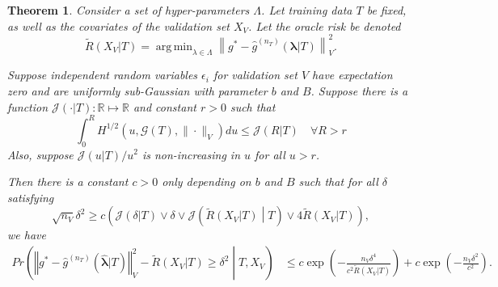 \documentclass[10pt]{book}
\newtheorem{theorem}{Theorem}
\theoremstyle{definition}
\DeclareMathOperator*{\argmin}{arg\,min}
\begin{document}
\begin{theorem}
	\label{thrm:train_val_complicated}
	Consider a set of hyper-parameters $\Lambda$.
	Let training data $T$ be fixed, as well as the covariates of the validation set $X_V$.
	Let the oracle risk be denoted
	\begin{equation}
	\tilde{R}(X_V|T) = \argmin_{\lambda \in \Lambda} \left \| g^*-\hat{g}^{(n_T)}( \boldsymbol{\lambda} | T) \right \|_{V}^{2}.
	\label{eq:tilde_lambda_def}
	\end{equation}
	
	Suppose independent random variables $\epsilon_i$ for validation set $V$ have expectation zero and are uniformly sub-Gaussian with parameter $b$ and $B$.
	Suppose there is a function $\mathcal{J} (\cdot | T):\mathbb{R}\mapsto\mathbb{R}$ and constant $r > 0$ such that
	\begin{equation}
	\label{eq:dudley_bound}
	\int_{0}^{R}H^{1/2}(u,\mathcal{G}(T),\|\cdot\|_{V})du\le \mathcal{J} (R| T) \quad \forall R>r
	\end{equation}
	Also, suppose $\mathcal{J} \left(u | T \right)/u^{2}$ is non-increasing in $u$ for all $u > r$.

	Then there is a constant $c>0$ only depending on $b$ and $B$ such that for all $\delta$ satisfying
	\begin{equation}
	\label{eq:train_val_delta_condn}
	\sqrt{n_V}\delta^{2}
	\ge
	c \left ( 
	\mathcal{J}(\delta| T)
	\vee 
	\delta
	\vee
	\mathcal{J} \left (\tilde{R}(X_V|T)\middle | T
	\right ) 
	\vee
	4 \tilde{R}(X_V|T) \right ),
	\end{equation}
	we have
	\begin{align}
		Pr\left(
		\left\Vert g^* - \hat{g}^{(n_T)}( \hat{\boldsymbol{\lambda}} | T) \right\Vert _{V}^2 -
		\tilde{R}(X_V|T)
		\ge\delta^2
		\middle | 
		T, X_V
		\right )
		&\le c\exp\left(-\frac{n_{V}\delta^{4}}{
			c^{2}
			\tilde{R}(X_V|T)
		}\right) 
		+c\exp\left(-\frac{n_{V}\delta^{2}}{c^{2}}\right).
	\end{align}
\end{theorem}
\end{document}
